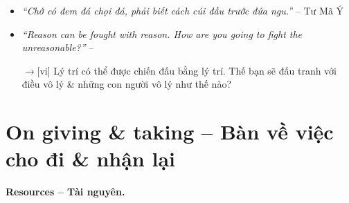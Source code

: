 \documentclass[12pt,twoside]{book}
\begin{document}
\begin{itemize}
	\item {\sf[cn$\to$vi]} {\it``Chớ có đem đá chọi đá, phải biết cách cúi đầu trước đứa ngu.''} -- {\sc Tư Mã Ý}
	
	\item {\it``Reason can be fought with reason. How are you going to fight the unreasonable?''} -- \cite{Rand_fountainhead}
	
	{\sf[en]$\to$[vi]} Lý trí có thể được chiến đấu bằng lý trí. Thế bạn sẽ đấu tranh với điều vô lý \& những con người vô lý như thế nào?
\end{itemize}


\section{On giving \& taking -- Bàn về việc cho đi \& nhận lại}
{\bf \textsf{Resources -- Tài nguyên.}}
\end{document}
